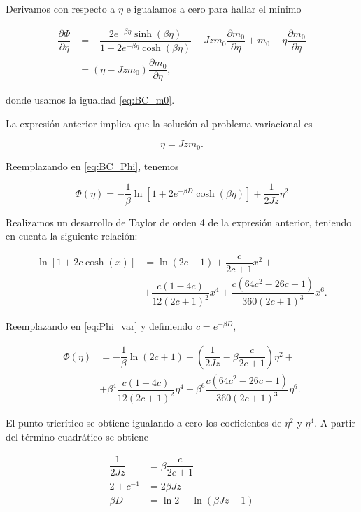 \documentclass[10pt]{article}
\begin{document}
Derivamos con respecto a $\eta$ e igualamos a cero para hallar el m\'inimo

\begin{align}
\dfrac{\partial \Phi}{\partial \eta} &= -  \dfrac{2e^{-\beta \eta}\sinh\left( \beta \eta \right)}{1+2e^{-\beta \eta}\cosh\left( \beta \eta \right)} - Jzm_0 \dfrac{\partial m_0}{\partial \eta} + m_0 + \eta \dfrac{\partial m_0}{\partial \eta} \nonumber \\
&= \left(\eta - Jzm_0\right) \dfrac{\partial m_0}{\partial \eta},
\end{align}

donde usamos la igualdad \ref{eq:BC_m0}.

La expresi\'on anterior implica que la soluci\'on al problema variacional es 

\begin{equation}
\eta = Jzm_0.
\end{equation}

Reemplazando en \ref{eq:BC_Phi}, tenemos

\begin{equation}\label{eq:Phi_var}
\Phi(\eta) = -\dfrac{1}{\beta} \ln \left[ 1 + 2e^{-\beta D} \cosh\left(\beta \eta\right) \right]  + \dfrac{1}{2Jz} \eta^2
\end{equation}

Realizamos un desarrollo de Taylor de orden 4 de la expresi\'on anterior, teniendo en cuenta la siguiente relaci\'on:

\begin{align*}
\ln \left[ 1+ 2 c \cosh(x) \right] &= \ln(2c+1) + \dfrac{c}{2c+1} x^2 + \\
&+ \dfrac{c(1-4c)}{12(2c+1)^2} x^4 + \dfrac{c(64c^2-26c+1)}{360(2c+1)^3} x^6.
\end{align*}

Reemplazando en \ref{eq:Phi_var} y definiendo $c = e^{-\beta D}$,

\begin{align*}
\Phi(\eta)  &= -\dfrac{1}{\beta}\ln(2c+1) +\left( \dfrac{1}{2Jz} - \beta \dfrac{c}{2c+1}\right) \eta^2 + \\
&+ \beta^4\dfrac{c(1-4c)}{12(2c+1)^2} \eta^4 + \beta^6\dfrac{c(64c^2-26c+1)}{360(2c+1)^3} \eta^6.
\end{align*}

El punto tricr\'itico se obtiene igualando a cero los coeficientes de $\eta^2$ y $\eta^4$. A partir del t\'ermino cuadr\'atico se obtiene

\begin{align*}
\dfrac{1}{2Jz} &= \beta \dfrac{c}{2c+1} \\
2 + c^{-1} &= 2\beta J z \\
\beta D &= \ln 2 + \ln(\beta J z - 1)
\end{align*}
\end{document}
